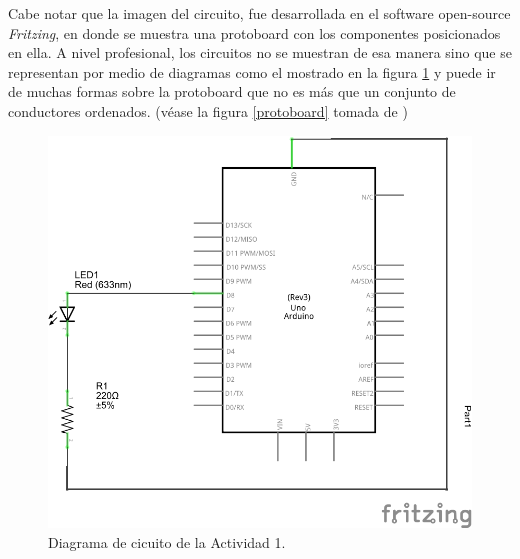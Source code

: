 \documentclass[letterpaper, 10pt]{report}
\begin{document}
Cabe notar que la imagen del circuito, fue desarrollada en el software open-source \emph{Fritzing}, en donde se muestra una protoboard con los componentes posicionados en ella. A nivel profesional, los circuitos no se muestran de esa manera sino que se representan por medio de diagramas como el mostrado en la figura \ref{diagrama1} y puede ir de muchas formas sobre la protoboard que no es más que un conjunto de conductores ordenados. (véase la figura \ref{protoboard} tomada de \cite{SIK})

\begin{figure}[h]
\centering
\includegraphics[scale=0.9]{diagrama1.png}
\caption{Diagrama de cicuito de la Actividad 1. \label{diagrama1}}
\end{figure}
\end{document}

